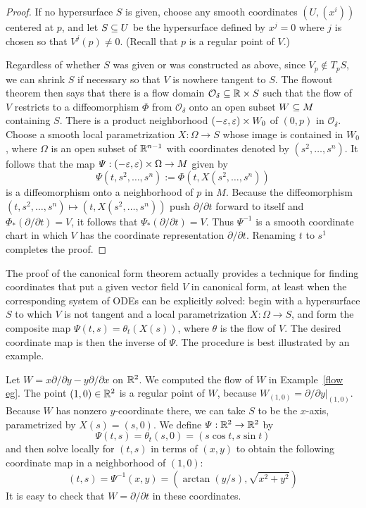 \begin{proof}
If no hypersurface $S$ is given, choose any smooth coordinates $(U,(x^i))$ centered at $p$, and let $S\subseteq U$ be the hypersurface defined by $x^j=0$ where $j$ is chosen so that $V^j(p)\neq0$. (Recall that $p$ is a regular point of $V$.)\par
Regardless of whether $S$ was given or was constructed as above, since $V_p\notin T_pS$, we can shrink $S$ if necessary so that $V$ is nowhere tangent to $S$. The flowout theorem then says that there is a flow domain $\mathcal{O}_\delta\subseteq\mathbb{R}\times S$ such that the flow of $V$ restricts to a diffeomorphism $\varPhi$ from $\mathcal{O}_\delta$ onto an open subset $W\subseteq M$ containing $S$. There is a product neighborhood $(-\varepsilon,\varepsilon)\times W_0$ of $(0,p)$ in $\mathcal{O}_\delta$. Choose a smooth local parametrization $X:\Omega\to S$ whose image is contained in $W_0$, where $\Omega$ is an open subset of $\mathbb{R}^{n-1}$ with coordinates denoted by $(s^2,\dots,s^n)$. It follows that the map $\varPsi:(-\varepsilon,\varepsilon)\times\Omega\to M$ given by
\[\varPsi(t,s^2,\dots,s^n):=\varPhi(t,X(s^2,\dots,s^n))\]
is a diffeomorphism onto a neighborhood of $p$ in $M$. Because the diffeomorphism $(t,s^2,\dots,s^n)\mapsto(t,X(s^2,\dots,s^n))$ push $\partial/\partial t$ forward to itself and $\varPhi_*(\partial/\partial t)=V$, it follows that $\varPsi_*(\partial/\partial t)=V$. Thus $\varPsi^{-1}$ is a smooth coordinate chart in which $V$ has the coordinate representation $\partial/\partial t$. Renaming $t$ to $s^1$ completes the proof.
\end{proof}
The proof of the canonical form theorem actually provides a technique for finding coordinates that put a given vector field $V$ in canonical form, at least when the corresponding system of ODEs can be explicitly solved: begin with a hypersurface $S$ to which $V$ is not tangent and a local parametrization $X:\Omega\to S$, and form the composite map $\varPsi(t,s)=\theta_t(X(s))$, where $\theta$ is the flow of $V$. The desired coordinate map is then the inverse of $\varPsi$. The procedure is best illustrated by an example.
\begin{example}\label{flow eg canonical form}
Let $W=x\partial/\partial y-y\partial/\partial x$ on $\mathbb{R}^2$. We computed the flow of $W$ in Example~\ref{flow eg}. The point $(1,0)\in\mathbb{R}^2$ is a regular point of $W$, because $W_{(1,0)}=\partial/\partial y|_{(1,0)}$. Because $W$ has nonzero $y$-coordinate there, we can take $S$ to be the $x$-axis, parametrized by $X(s)=(s,0)$. We define $\varPsi:\mathbb{R}^2\to\mathbb{R}^2$ by
\[\varPsi(t,s)=\theta_t(s,0)=(s\cos t,s\sin t)\]
and then solve locally for $(t,s)$ in terms of $(x,y)$ to obtain the following coordinate map in a neighborhood of $(1,0)$:
\[(t,s)=\varPsi^{-1}(x,y)=(\arctan(y/s),\sqrt{x^2+y^2})\]
It is easy to check that $W=\partial/\partial t$ in these coordinates.
\end{example}
